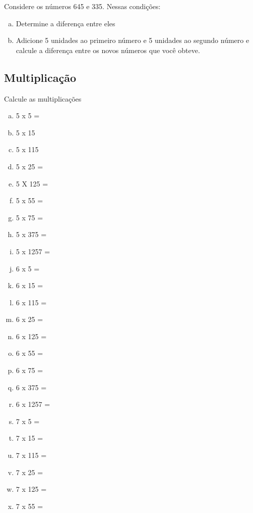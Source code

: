 \item Considere os números 645 e 335. Nessas condições:
\begin{enumerate}[a)]
	\item Determine a diferença entre eles
	\item Adicione 5 unidades ao primeiro número e 5 unidades ao segundo número e calcule a diferença entre os novos números que você obteve. 
\end{enumerate}



\subsection{Multiplicação}



\item Calcule as multiplicações
\begin{multicols}{4}
\begin{enumerate}[a)]
	\item 5 x 5 =
	\item 5 x 15
	\item 5 x 115
	\item 5 x 25 =
	\item 5 X 125 =
	\item 5 x 55 =
	\item 5 x 75 =
	\item 5 x 375 =
	\item 5 x 1257 =
	\item 6 x 5 =
	\item 6 x 15 = 
	\item 6 x 115 =
	\item 6 x 25 =
	\item 6 x 125 =
	\item 6 x 55 =
	\item 6 x 75 =
	\item 6 x 375 =
	\item 6 x 1257 =
	\item 7 x 5 =
	\item 7 x 15 =
	\item 7 x 115 =
	\item 7 x 25 =
	\item 7 x 125 =
	\item 7 x 55 =
\end{enumerate}
\end{multicols}

